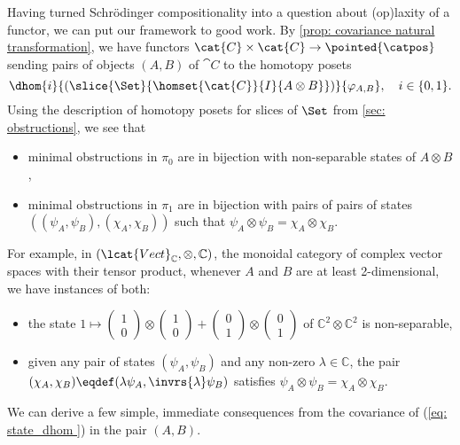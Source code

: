 Having turned Schr\"odinger compositionality into a question about (op)laxity of a functor, we can put our framework to good work.
By \autoref{prop: covariance natural transformation}, we have functors $\cat{C} \times \cat{C} \to \pointed{\catpos}$ sending pairs of objects $(A, B)$ of $\cat{C}$ to the homotopy posets 
\begin{equation} \label{eq: state_dhom }
    \dhom{i}{(\slice{\Set}{\homset{\cat{C}}{I}{A \otimes B}})}{\varphi_{A, B}}, \quad i \in \{ 0, 1 \}.
\end{equation}
Using the description of homotopy posets for slices of $\Set$ from \autoref{sec: obstructions}, we see that
\begin{itemize}
    \item minimal obstructions in $\pi_0$ are in bijection with non-separable states of $A \otimes B$,
    \item minimal obstructions in $\pi_1$ are in bijection with pairs of pairs of states $((\psi_A, \psi_B), (\chi_A, \chi_B))$ such that $\psi_A \otimes \psi_B = \chi_A \otimes \chi_B$.
\end{itemize}
For example, in $(\lcat{Vect}_\mathbb{C}, \otimes, \mathbb{C})$, the monoidal category of complex vector spaces with their tensor product, whenever $A$ and $B$ are at least 2-dimensional, we have instances of both:
\begin{itemize}
    \item the state $1 \mapsto \begin{pmatrix}1 \\ 0\end{pmatrix} \otimes \begin{pmatrix}1 \\ 0\end{pmatrix} + \begin{pmatrix}0 \\ 1\end{pmatrix} \otimes \begin{pmatrix}0 \\ 1\end{pmatrix}$ of $\mathbb{C}^2 \otimes \mathbb{C}^2$ is non-separable,
    \item given any pair of states $(\psi_A, \psi_B)$ and any non-zero $\lambda \in \mathbb{C}$, the pair $(\chi_A, \chi_B) \eqdef (\lambda \psi_A, \invrs{\lambda} \psi_B)$ satisfies $\psi_A \otimes \psi_B = \chi_A \otimes \chi_B$.
\end{itemize}
We can derive a few simple, immediate consequences from the covariance of (\ref{eq: state_dhom }) in the pair $(A, B)$.
